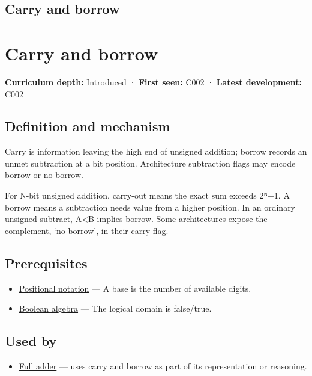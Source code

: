 \hypertarget{appendix-d52d5f78ffd1}{}
\section*{Carry and borrow}
\chapter{Carry and borrow}\label{appendix-d52d5f78ffd1-carry-and-borrow}

\textbf{Curriculum depth:} Introduced · \textbf{First seen:} C002 · \textbf{Latest development:} C002

\section{Definition and mechanism}\label{appendix-d52d5f78ffd1-definition-and-mechanism}

Carry is information leaving the high end of unsigned addition; borrow records an unmet subtraction at a bit position. Architecture subtraction flags may encode borrow or no-borrow.

For N-bit unsigned addition, carry-out means the exact sum exceeds 2ᴺ−1. A borrow means a subtraction needs value from a higher position. In an ordinary unsigned subtract, A\textless B implies borrow. Some architectures expose the complement, `no borrow', in their carry flag.

\section{Prerequisites}\label{appendix-d52d5f78ffd1-prerequisites}

\begin{itemize}
\tightlist
\item
  \hyperref[appendix-83c3f28f7bda]{Positional notation} --- A base is the number of available digits.
\item
  \hyperref[appendix-24475e1596a8]{Boolean algebra} --- The logical domain is false/true.
\end{itemize}

\section{Used by}\label{appendix-d52d5f78ffd1-used-by}

\begin{itemize}
\tightlist
\item
  \hyperref[appendix-d1a5b1e520c2]{Full adder} --- uses carry and borrow as part of its representation or reasoning.
\end{itemize}

